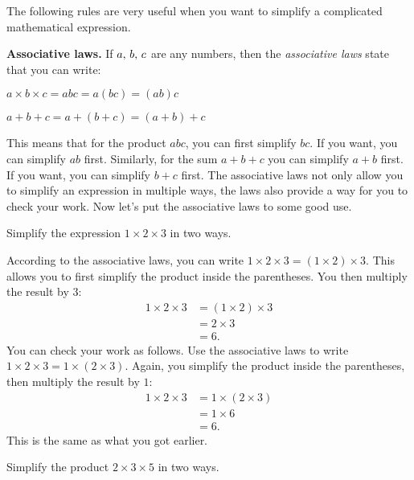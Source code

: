 \documentclass[a4paper,oneside,12pt]{article}
\begin{document}
The following rules are very useful when you want to simplify a
complicated mathematical expression.

\begin{definition}
\textbf{Associative laws.}
If ${a},\, {b},\, {c}$ are any numbers, then the
\emph{associative laws} state that you can write:
\begin{packedenumeral}
\item $a \times b \times c = abc = a (bc) = (ab) c$

\item $a + b + c = a + (b + c) = (a + b) + c$
\end{packedenumeral}
\end{definition}

This means that for the product $abc$, you can first simplify $bc$.
If you want, you can simplify $ab$ first.  Similarly, for the sum
$a + b + c$ you can simplify $a + b$ first.  If you want, you can
simplify $b + c$ first.  The associative laws not only allow you to
simplify an expression in multiple ways, the laws also provide a way
for you to check your work.  Now let's put the associative laws to
some good use.

\begin{example}
Simplify the expression $1 \times 2 \times 3$ in two ways.
\end{example}

\begin{solution}
According to the associative laws, you can write
$1 \times 2 \times 3 = (1 \times 2) \times 3$.  This allows you to
first simplify the product inside the parentheses.  You then multiply
the result by $3$:
\begin{align*}
1 \times 2 \times 3
&=
(1 \times 2) \times 3 \\[4pt]
&=
2 \times 3 \\[4pt]
&=
6.
\end{align*}
You can check your work as follows.  Use the associative laws to write
$1 \times 2 \times 3 = 1 \times (2 \times 3)$.  Again, you simplify
the product inside the parentheses, then multiply the result by $1$:
\begin{align*}
1 \times 2 \times 3
&=
1 \times (2 \times 3) \\[4pt]
&=
1 \times 6 \\[4pt]
&=
6.
\end{align*}
This is the same as what you got earlier.
\end{solution}

\begin{exercise}
Simplify the product $2 \times 3 \times 5$ in two ways.
\end{exercise}
\end{document}
